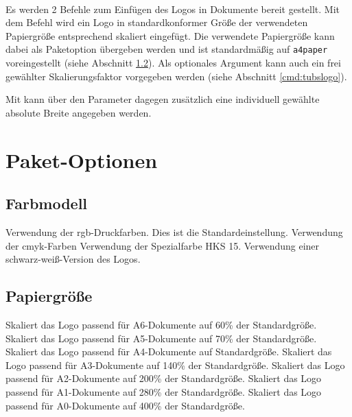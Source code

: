 \begin{Declaration}
  \\
\end{Declaration}


Es werden 2 Befehle zum Einfügen des Logos in Dokumente bereit gestellt.
Mit dem Befehl  wird ein Logo in
standardkonformer Größe der verwendeten Papiergröße entsprechend skaliert
eingefügt. Die verwendete Papiergröße kann dabei als Paketoption übergeben
werden und ist standardmäßig auf \lstinline{a4paper} voreingestellt
(siehe Abschnitt \ref{options:papersize}).
Als optionales Argument kann auch ein frei gewählter Skalierungsfaktor
vorgegeben werden (siehe Abschnitt \ref{cmd:tubslogo}).

Mit  kann über den Parameter  dagegen
zusätzlich eine individuell gewählte absolute Breite angegeben werden.


\section{Paket-Optionen}

\subsection{Farbmodell}\label{options:color}

\begin{description}
  \classoptionitem[rgb]
    Verwendung der rgb-Druckfarben. Dies ist die Standardeinstellung.
  \classoptionitem[cmyk]
    Verwendung der cmyk-Farben
  \classoptionitem[hks]
    Verwendung der Spezialfarbe HKS 15.
  \classoptionitem[mono]
    Verwendung einer schwarz-weiß-Version des Logos.
\end{description}

\subsection{Papiergröße}\label{options:papersize}

\begin{description}
  \classoptionitem[a6paper]
    Skaliert das Logo passend für A6-Dokumente auf 60\% der Standardgröße.
  \classoptionitem[a5paper]
    Skaliert das Logo passend für A5-Dokumente auf 70\% der Standardgröße.
  \classoptionitem[a4paper]
    Skaliert das Logo passend für A4-Dokumente auf Standardgröße.
  \classoptionitem[a3paper]
    Skaliert das Logo passend für A3-Dokumente auf 140\% der Standardgröße.
  \classoptionitem[a2paper]
    Skaliert das Logo passend für A2-Dokumente auf 200\% der Standardgröße.
  \classoptionitem[a1paper]
    Skaliert das Logo passend für A1-Dokumente auf 280\% der Standardgröße.
  \classoptionitem[a0paper]
    Skaliert das Logo passend für A0-Dokumente auf 400\% der Standardgröße.
\end{description}


